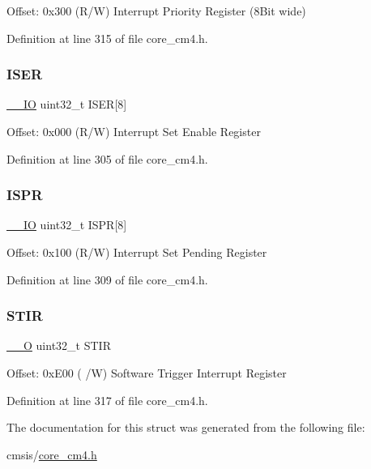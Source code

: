 Offset\+: 0x300 (R/W) Interrupt Priority Register (8\+Bit wide) 

Definition at line 315 of file core\+\_\+cm4.\+h.

\mbox{\label{struct_n_v_i_c___type_a0bf79013b539f9f929c75bd50f8ec67d}} 
\subsubsection{\texorpdfstring{I\+S\+ER}{ISER}}
{\footnotesize\ttfamily \hyperlink{group___c_m_s_i_s__core__definitions_gaec43007d9998a0a0e01faede4133d6be}{\+\_\+\+\_\+\+IO} uint32\+\_\+t I\+S\+ER\mbox{[}8\mbox{]}}

Offset\+: 0x000 (R/W) Interrupt Set Enable Register 

Definition at line 305 of file core\+\_\+cm4.\+h.

\mbox{\label{struct_n_v_i_c___type_ab39acf254b485e3ad71b18aa9f1ca594}} 
\subsubsection{\texorpdfstring{I\+S\+PR}{ISPR}}
{\footnotesize\ttfamily \hyperlink{group___c_m_s_i_s__core__definitions_gaec43007d9998a0a0e01faede4133d6be}{\+\_\+\+\_\+\+IO} uint32\+\_\+t I\+S\+PR\mbox{[}8\mbox{]}}

Offset\+: 0x100 (R/W) Interrupt Set Pending Register 

Definition at line 309 of file core\+\_\+cm4.\+h.

\mbox{\label{struct_n_v_i_c___type_a471c399bb79454dcdfb342a31a5684ae}} 
\subsubsection{\texorpdfstring{S\+T\+IR}{STIR}}
{\footnotesize\ttfamily \hyperlink{group___c_m_s_i_s__core__definitions_ga7e25d9380f9ef903923964322e71f2f6}{\+\_\+\+\_\+O} uint32\+\_\+t S\+T\+IR}

Offset\+: 0x\+E00 ( /W) Software Trigger Interrupt Register 

Definition at line 317 of file core\+\_\+cm4.\+h.



The documentation for this struct was generated from the following file\+:\begin{DoxyCompactItemize}
\item 
cmsis/\hyperlink{core__cm4_8h}{core\+\_\+cm4.\+h}\end{DoxyCompactItemize}
